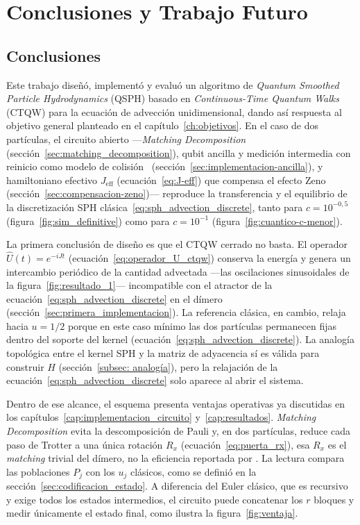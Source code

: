 
\chapter{Conclusiones y Trabajo Futuro}
\label{sec:conclusiones}

\section{Conclusiones}

Este trabajo diseñó, implementó y evaluó un algoritmo de \emph{Quantum Smoothed Particle Hydrodynamics} (QSPH) basado en \emph{Continuous-Time Quantum Walks} (CTQW) para la ecuación de advección unidimensional, dando así respuesta al objetivo general planteado en el capítulo~\ref{ch:objetivos}. En el caso de dos partículas, el circuito abierto ---\emph{Matching Decomposition} (sección~\ref{sec:matching_decomposition}), qubit ancilla y medición intermedia con reinicio como modelo de colisión~\cite{Ciccarello_2022} (sección~\ref{sec:implementacion-ancilla}), y hamiltoniano efectivo $J_{\mathrm{eff}}$ (ecuación~\eqref{eq:J-eff}) que compensa el efecto Zeno (sección~\ref{sec:compensacion-zeno})--- reproduce la transferencia y el equilibrio de la discretización SPH clásica~\eqref{eq:sph_advection_discrete}, tanto para $c=10^{-0{,}5}$ (figura~\ref{fig:sim_definitive}) como para $c=10^{-1}$ (figura~\ref{fig:cuantico-c-menor}).

La primera conclusión de diseño es que el CTQW cerrado no basta. El operador $\hat{U}(t)=e^{-iJt}$ (ecuación~\eqref{eq:operador_U_ctqw}) conserva la energía y genera un intercambio periódico de la cantidad advectada ---las oscilaciones sinusoidales de la figura~\ref{fig:resultado_1}--- incompatible con el atractor de la ecuación~\eqref{eq:sph_advection_discrete} en el dímero (sección~\ref{sec:primera_implementacion}). La referencia clásica, en cambio, relaja hacia $u=1/2$ porque en este caso mínimo las dos partículas permanecen fijas dentro del soporte del kernel (ecuación~\eqref{eq:sph_advection_discrete}). La analogía topológica entre el kernel SPH y la matriz de adyacencia sí es válida para construir $H$ (sección~\ref{subsec: analogía}), pero la relajación de la ecuación~\eqref{eq:sph_advection_discrete} solo aparece al abrir el sistema.

Dentro de ese alcance, el esquema presenta ventajas operativas ya discutidas en los capítulos~\ref{cap:implementacion_circuito} y~\ref{cap:resultados}. \emph{Matching Decomposition} evita la descomposición de Pauli y, en dos partículas, reduce cada paso de Trotter a una única rotación $R_x$ (ecuación~\eqref{eq:puerta_rx}), esa $R_x$ es el \emph{matching} trivial del dímero, no la eficiencia reportada por \cite{matching2026}. La lectura compara las poblaciones $P_j$ con los $u_j$ clásicos, como se definió en la sección~\ref{sec:codificacion_estado}. A diferencia del Euler clásico, que es recursivo y exige todos los estados intermedios, el circuito puede concatenar los $r$ bloques y medir únicamente el estado final, como ilustra la figura~\ref{fig:ventaja}.

